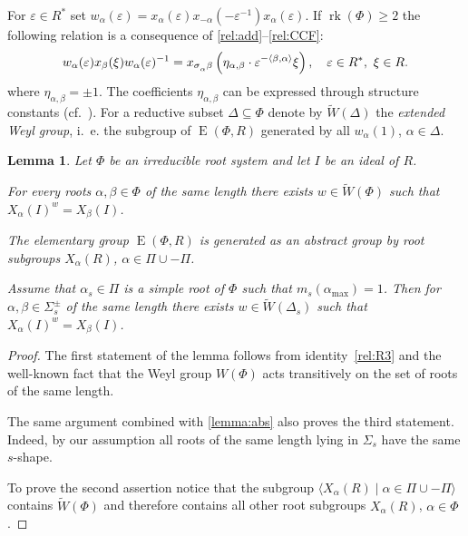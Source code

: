 \documentclass[12pt]{amsart}
\theoremstyle{plain}
\numberwithin{equation}{section}
\newtheorem{lemma}{Lemma}
\numberwithin{lemma}{section}
\theoremstyle{definition}
\theoremstyle{remark}
\DeclareMathOperator{\E}{E}
\DeclareMathOperator{\rk}{rk}
\def\ssub#1{\mathchoice
   {_{\lower2pt\hbox{$\scriptstyle #1$}}}
   {_{\lower2pt\hbox{$\scriptstyle #1$}}}
   {_{\lower1.5pt\hbox{$\scriptscriptstyle #1$}}}
   {_{\!\lower1.5pt\hbox{$\scriptscriptstyle #1$}}}}
\begin{document}
For $\varepsilon\in R^*$ set $w_\alpha(\varepsilon) = x_\alpha(\varepsilon) x_{-\alpha}(-\varepsilon^{-1}) x_{\alpha}(\varepsilon).$
If $\rk(\Phi)\geqslant 2$ the following relation is a consequence of \eqref{rel:add}--\eqref{rel:CCF}:
\begin{equation}\label{rel:R3}
w_\alpha(\varepsilon) x_{\beta}(\xi) w_\alpha(\varepsilon)^{-1} =
x_{\sigma\ssub{\alpha}\beta} \left(\eta_{\alpha, \beta}\cdot\varepsilon^{-\langle\beta, \alpha \rangle}\xi\right), \quad \varepsilon\in R^*, \ \xi\in R.
\end{equation}
where $\eta_{\alpha, \beta}=\pm 1$. The coefficients $\eta_{\alpha, \beta}$ can be expressed through structure constants (cf.~\cite[\S13]{VP}).
For a reductive subset $\Delta \subseteq \Phi$ denote by $\widetilde{W}(\Delta)$ the \emph{extended Weyl group}, i.\, e. the subgroup of $\E(\Phi, R)$ generated by all $w_{\alpha}(1)$, $\alpha \in \Delta$.
\begin{lemma} \label{lemma:weylfacts} Let $\Phi$ be an irreducible root system and let $I$ be an ideal of $R$. 
\begin{lemlist}
\item \label{item-trans1} For every roots $\alpha, \beta \in \Phi$ of the same length there exists $w \in \widetilde{W}(\Phi)$ such that $X_{\alpha}(I)^w = X_\beta(I)$.
\item \label{item-egen} The elementary group $\E(\Phi, R)$  is generated as an abstract group by root subgroups $X_{\alpha}(R)$, $\alpha \in \Pi \cup -\Pi$.
\item \label{item-trans2} Assume that $\alpha_s\in \Pi$ is a simple root of $\Phi$ such that $m_s(\alpha_\mathrm{max}) = 1$. 
                          Then for $\alpha, \beta \in \Sigma^\pm_s$ of the same length there exists $w\in \widetilde{W}(\Delta_s)$ such that $X_\alpha(I)^w = X_\beta(I)$. \end{lemlist}
\end{lemma}
\begin{proof}
The first statement of the lemma follows from identity~\eqref{rel:R3} and the well-known fact that the Weyl group $W(\Phi)$ acts transitively on the set of roots of the same length.
 
The same argument combined with \cref{lemma:abs} also proves the third statement. Indeed, by our assumption all roots of the same length lying in $\Sigma_s$ have the same $s$-shape.
 
To prove the second assertion notice that the subgroup $\langle X_\alpha(R) \mid \alpha \in \Pi \cup -\Pi \rangle$ contains $\widetilde{W}(\Phi)$ and therefore contains all other root subgroups $X_\alpha(R)$, $\alpha\in \Phi$. \end{proof}
\end{document}
